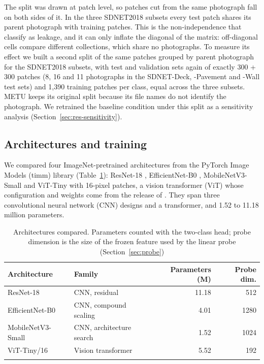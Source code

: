 \documentclass[pdflatex,sn-apa]{sn-jnl}
\begin{document}
The split was drawn at patch level, so patches cut from the same photograph fall on both sides of it. In the three SDNET2018 subsets every test patch shares its parent photograph with training patches. This is the non-independence that \citet{kapoor2023} classify as leakage, and it can only inflate the diagonal of the matrix: off-diagonal cells compare different collections, which share no photographs. To measure its effect we built a second split of the same patches grouped by parent photograph for the SDNET2018 subsets, with test and validation sets again of exactly 300 + 300 patches (8, 16 and 11 photographs in the SDNET-Deck, -Pavement and -Wall test sets) and 1,390 training patches per class, equal across the three subsets. METU keeps its original split because its file names do not identify the photograph. We retrained the baseline condition under this split as a sensitivity analysis (Section~\ref{sec:res-sensitivity}).

\subsection{Architectures and training}\label{sec:train}

We compared four ImageNet-pretrained architectures from the PyTorch Image Models (timm) library (Table~\ref{tab:arch}): ResNet-18 \citep{he2016}, EfficientNet-B0 \citep{tan2019}, MobileNetV3-Small \citep{howard2019} and ViT-Tiny with 16-pixel patches, a vision transformer (ViT) \citep{dosovitskiy2021} whose configuration and weights come from the release of \citet{steiner2021}. They span three convolutional neural network (CNN) designs and a transformer, and 1.52 to 11.18 million parameters.

\begin{table}[t]
\caption{Architectures compared. Parameters counted with the two-class head; probe dimension is the size of the frozen feature used by the linear probe (Section~\ref{sec:probe})}\label{tab:arch}
\begin{tabular*}{\textwidth}{@{\extracolsep\fill}llrr@{}}
\toprule
Architecture & Family & Parameters (M) & Probe dim. \\
\midrule
ResNet-18 & CNN, residual & 11.18 & 512 \\
EfficientNet-B0 & CNN, compound scaling & 4.01 & 1280 \\
MobileNetV3-Small & CNN, architecture search & 1.52 & 1024 \\
ViT-Tiny/16 & Vision transformer & 5.52 & 192 \\
\botrule
\end{tabular*}
\end{table}
\end{document}
